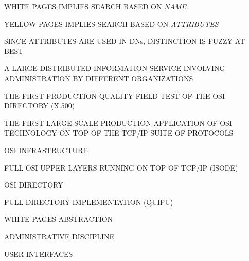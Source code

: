 \begin{bwslide}

\begin{nrtc}
\item	WHITE PAGES IMPLIES SEARCH BASED ON \emph{NAME}

\item	YELLOW PAGES IMPLIES SEARCH BASED ON \emph{ATTRIBUTES}

\item	SINCE ATTRIBUTES ARE USED IN DNs, DISTINCTION IS FUZZY AT BEST
\end{nrtc}
\end{bwslide}


\begin{bwslide}

\begin{nrtc}
\item	A LARGE DISTRIBUTED INFORMATION SERVICE INVOLVING ADMINISTRATION BY
	DIFFERENT ORGANIZATIONS

\item	THE FIRST PRODUCTION-QUALITY FIELD TEST OF THE OSI DIRECTORY (X.500)

\item	THE FIRST LARGE SCALE PRODUCTION APPLICATION OF OSI TECHNOLOGY ON TOP
	OF THE TCP/IP SUITE OF PROTOCOLS
\end{nrtc}
\end{bwslide}


\begin{bwslide}

\begin{nrtc}
\item	OSI INFRASTRUCTURE
    \begin{nrtc}
    \item	FULL OSI UPPER-LAYERS RUNNING ON TOP OF TCP/IP (ISODE)
    \end{nrtc}

\item	OSI DIRECTORY
    \begin{nrtc}
    \item	FULL DIRECTORY IMPLEMENTATION (QUIPU)
    \end{nrtc}

\item	WHITE PAGES ABSTRACTION
    \begin{nrtc}
    \item	ADMINISTRATIVE DISCIPLINE

    \item	USER INTERFACES
    \end{nrtc}
\end{nrtc}
\end{bwslide}


